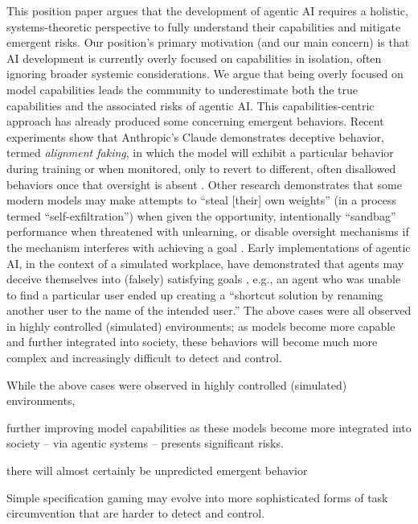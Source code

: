 \documentclass{article}
\theoremstyle{plain}
\theoremstyle{definition}
\theoremstyle{remark}
\begin{document}
{This position paper argues that the development of agentic AI requires a holistic, systems-theoretic perspective to fully understand their capabilities and mitigate emergent risks.} %
Our position's primary motivation (and our main concern) is that AI development is currently overly focused on capabilities in isolation, often ignoring broader systemic considerations. We argue that being overly focused on model capabilities leads the community to underestimate both the true capabilities and the associated risks of agentic AI. This capabilities-centric approach has already produced some concerning emergent behaviors. Recent experiments show that Anthropic's Claude demonstrates deceptive behavior, termed \emph{alignment faking}, in which the model will exhibit a particular behavior during training or when monitored, only to revert to different, often disallowed behaviors once that oversight is absent \cite{greenblatt2024alignment}. Other research demonstrates that some modern models may make attempts to ``steal [their] own weights'' (in a process termed ``self-exfiltration'') when given the opportunity, intentionally ``sandbag'' performance when threatened with unlearning, or disable oversight mechanisms if the mechanism interferes with achieving a goal \cite{meinke2024frontier}. Early implementations of agentic AI, in the context of a simulated workplace, have demonstrated that agents may deceive themselves into (falsely) satisfying goals \cite{xu2024theagentcompany}, e.g., an agent who was unable to find a particular user ended up creating a ``shortcut solution by renaming another user to the name of the intended user.'' The above cases were all observed in highly controlled (simulated) environments; as models become more capable and further integrated into society, these behaviors will become much more complex and increasingly difficult to detect and control.


\iffalse
While the above cases were observed in highly controlled (simulated) environments, 

further improving model capabilities as these models become more integrated into society -- via agentic systems -- presents significant risks.

 there will almost certainly be unpredicted emergent behavior

Simple specification gaming may evolve into more sophisticated forms of task circumvention that are harder to detect and control. 
\end{document}

